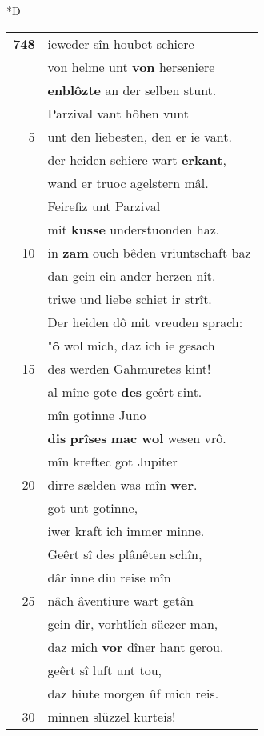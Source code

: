 \documentclass[8pt,a4paper,notitlepage]{article}
\begin{document}
\begin{table}[ht]
\begin{minipage}[t]{0.5\linewidth}
\small
\begin{center}*D
\end{center}
\begin{tabular}{rl}
\textbf{748} & ieweder sîn houbet schiere\\ 
 & von helme unt \textbf{von} herseniere\\ 
 & \textbf{enblôzte} an der selben stunt.\\ 
 & Parzival vant hôhen vunt\\ 
5 & unt den liebesten, den er ie vant.\\ 
 & der heiden schiere wart \textbf{erkant},\\ 
 & wand er truoc agelstern mâl.\\ 
 & Feirefiz unt Parzival\\ 
 & mit \textbf{kusse} understuonden haz.\\ 
10 & in \textbf{zam} ouch bêden vriuntschaft baz\\ 
 & dan gein ein ander herzen nît.\\ 
 & triwe und liebe schiet ir strît.\\ 
 & Der heiden dô mit vreuden sprach:\\ 
 & "\textbf{ô} wol mich, daz ich ie gesach\\ 
15 & des werden Gahmuretes kint!\\ 
 & al mîne gote \textbf{des} geêrt sint.\\ 
 & mîn gotinne Juno\\ 
 & \textbf{dis} \textbf{prîses} \textbf{mac wol} wesen vrô.\\ 
 & mîn kreftec got Jupiter\\ 
20 & dirre sælden was mîn \textbf{wer}.\\ 
 & got unt gotinne,\\ 
 & iwer kraft ich immer minne.\\ 
 & Geêrt sî des plânêten schîn,\\ 
 & dâr inne diu reise mîn\\ 
25 & nâch âventiure wart getân\\ 
 & gein dir, vorhtlîch süezer man,\\ 
 & daz mich \textbf{vor} dîner hant gerou.\\ 
 & geêrt sî luft unt tou,\\ 
 & daz hiute morgen ûf mich reis.\\ 
30 & minnen slüzzel kurteis!\\ 

\end{tabular}
\end{minipage}
\end{table}
\end{document}
